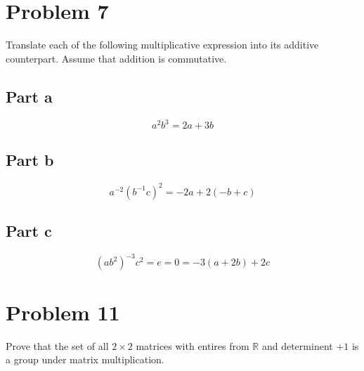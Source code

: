 \documentclass{article}
\begin{document}
\section*{Problem 7}

Translate each of the following multiplicative expression into its
additive counterpart.  Assume that addition is commutative.

\subsection*{Part a}
\begin{equation*}
a^2b^3 = 2a+3b
\end{equation*}
\subsection*{Part b}
\begin{equation*}
a^{-2}(b^{-1}c)^2 = -2a + 2(-b+c)
\end{equation*}
\subsection*{Part c}
\begin{equation*}
(ab^2)^{-3}c^2=e=0=-3(a+2b)+2c
\end{equation*}

\section*{Problem 11}

Prove that the set of all $2\times 2$ matrices with entires from $\mathbb{R}$
and determinent $+1$ is a group under matrix multiplication.
\end{document}
